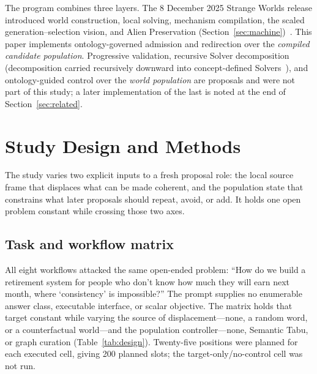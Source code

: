 \documentclass[11pt,a4paper]{article}
\begin{document}
The program combines three layers. The 8 December 2025 Strange Worlds release introduced world construction, local solving, mechanism compilation, the scaled generation--selection vision, and Alien Preservation (Section~\ref{sec:machine})~\cite{westerberg2025strangeworlds}. This paper implements ontology-governed admission and redirection over the \emph{compiled candidate population}. Progressive validation, recursive Solver decomposition (decomposition carried recursively downward into concept-defined Solvers~\cite{westerberg2026fractal}), and ontology-guided control over the \emph{world population} are proposals and were not part of this study; a later implementation of the last is noted at the end of Section~\ref{sec:related}.

\section{Study Design and Methods}

The study varies two explicit inputs to a fresh proposal role: the local source frame that displaces what can be made coherent, and the population state that constrains what later proposals should repeat, avoid, or add. It holds one open problem constant while crossing those two axes.

\subsection{Task and workflow matrix}

All eight workflows attacked the same open-ended problem: ``How do we build a retirement system for people who don't know how much they will earn next month, where `consistency' is impossible?'' The prompt supplies no enumerable answer class, executable interface, or scalar objective. The matrix holds that target constant while varying the source of displacement---none, a random word, or a counterfactual world---and the population controller---none, Semantic Tabu, or graph curation (Table~\ref{tab:design}). Twenty-five positions were planned for each executed cell, giving 200 planned slots; the target-only/no-control cell was not run.
\end{document}
